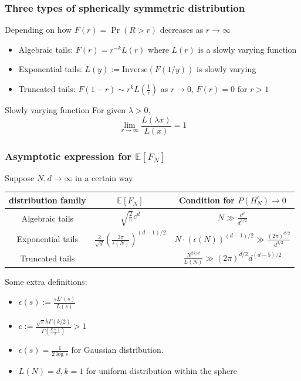 \documentclass{beamer}
\def\E{\mathbb{E}}
\begin{document}
\begin{frame}
    \frametitle{Three types of spherically symmetric distribution}
    Depending on how $F(r)=\Pr(R>r)$ decreases as $r\to \infty$
    \begin{itemize}
        \item Algebraic tails: $F(r)= r^{-k} L(r)$ where $L(r)$ is a slowly varying function
        \item Exponential tails: $L(y):=\textrm{Inverse}(F(1/y))$ is slowly varying
        \item Truncated tails: $F(1-r) \sim r^k L(\frac{1}{r})$ as $r\to 0$, $F(r)=0$ for $r>1$
    \end{itemize}
    \begin{block}
    {Slowly varying function}
    For given $\lambda >0$,
     \begin{equation}
          \lim_{x\to \infty}  \frac{L(\lambda x)}{L(x)} = 1
        \end{equation}
    \end{block}
\end{frame}
\begin{frame}
    \frametitle{Asymptotic expression for $\E[F_N]$}
    Suppose $N,d \to \infty$ in a certain way
    \begin{table}
    \begin{tabular}{|c|c|c|}
        \hline
        distribution family & $\E[F_N]$ & Condition for $P(H_N^c) \to 0$ \\
        \hline
       Algebraic tails & $\sqrt{\frac{2}{\pi}}
       c^d$
       & $N\gg \frac{c^d}{d^{3/2}}$ \\
       \hline
       Exponential tails & $\frac{2}{\sqrt{d}} (\frac{2\pi}{\epsilon(N)})^{(d-1)/2}$
       & $ N\cdot                                                                    (\epsilon(N))^{(d-1)/2} \gg \frac{(2\pi)^{d/2}}{d^{3/2}}$ \\
       \hline
       Truncated tails & 
       & $\frac{N^{2k/d}}{L(N)}
       \gg (2\pi)^{d/2}d^{(d-5)/2}$\\
       \hline
    \end{tabular}
\end{table}
Some extra definitions:
\begin{itemize}
\item $\epsilon(s):=\frac{sL'(s)}{L(s)}$
\item $c:=\frac{\sqrt{\pi}k\Gamma(k/2)}{\Gamma(\frac{k+1}{2})}>1$
\item $\epsilon(s)=\frac{1}{2\log s}$ for Gaussian distribution.
\item $L(N)=d,k=1$ for uniform distribution within the sphere
\end{itemize}
\end{frame}
\end{document}
